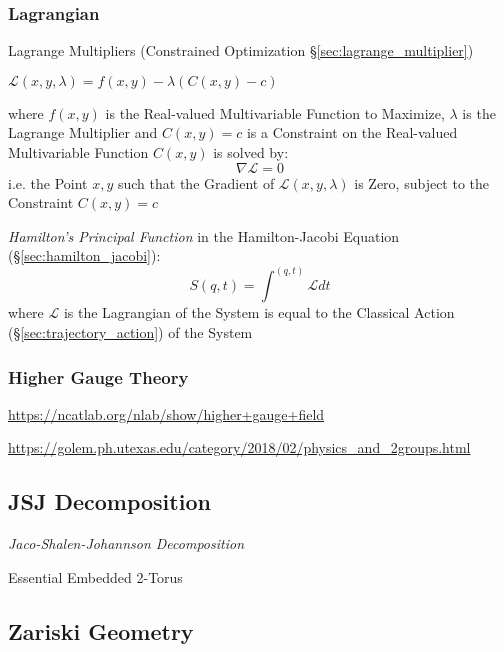 
\subsubsection{Lagrangian}\label{sec:lagrangian}

\fist Lagrange Multipliers (Constrained Optimization
\S\ref{sec:lagrange_multiplier})

$\mathcal{L}(x,y,\lambda) = f(x,y) - \lambda (C(x,y) - c)$

where $f(x,y)$ is the Real-valued Multivariable Function to Maximize, $\lambda$
is the Lagrange Multiplier and $C(x,y) = c$ is a Constraint on the Real-valued
Multivariable Function $C(x,y)$ is solved by:
\[
  \nabla\mathcal{L} = 0
\]
i.e. the Point $x,y$ such that the Gradient of $\mathcal{L}(x,y,\lambda)$ is
Zero, subject to the Constraint $C(x,y) = c$

\emph{Hamilton's Principal Function} in the Hamilton-Jacobi Equation
(\S\ref{sec:hamilton_jacobi}):
\[
  S(q,t) = \int^{(q,t)} \mathcal{L} dt
\]
where $\mathcal{L}$ is the Lagrangian of the System is equal to the Classical
Action (\S\ref{sec:trajectory_action}) of the System



\subsubsection{Higher Gauge Theory}\label{sec:higher_gauge_theory}

\url{https://ncatlab.org/nlab/show/higher+gauge+field}

\url{https://golem.ph.utexas.edu/category/2018/02/physics_and_2groups.html}



\subsection{JSJ Decomposition}\label{sec:jsj_decomposition}

\emph{Jaco-Shalen-Johannson Decomposition}

Essential Embedded 2-Torus



\subsection{Zariski Geometry}\label{sec:zariski_geometry}

